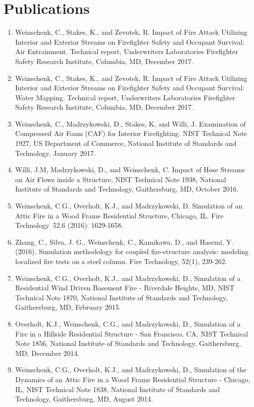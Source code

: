 \documentclass[10pt,letterpaper]{article}
\begin{document}
\clearpage

\section*{Publications}
\begin{enumerate}
\item Weinschenk, C., Stakes, K., and Zevotek, R. Impact of Fire Attack Utilizing Interior and Exterior Streams on Firefighter Safety and Occupant Survival: Air Entrainment. Technical report, Underwriters Laboratories Firefighter Safety Research Institute, Columbia, MD, December 2017.
\item Weinschenk, C., Stakes, K., and Zevotek, R. Impact of Fire Attack Utilizing Interior and Exterior Streams on Firefighter Safety and Occupant Survival: Water Mapping. Technical report, Underwriters Laboratories Firefighter Safety Research Institute, Columbia, MD, December 2017.
\item Weinschenk, C., Madrzykowski, D., Stakes, K, and Willi, J. Examination of Compressed Air Foam (CAF) for Interior Firefighting. NIST Technical Note 1927, US Department of Commerce, National Institute of Standards and Technology, January 2017.
\item Willi, J.M, Madrzykowski, D., and Weinschenk, C. Impact of Hose Streams on Air Flows inside a
Structure, NIST Technical Note 1938, National Institute of Standards and Technology, Gaithersburg, MD, October 2016.
\item Weinschenk, C.G., Overholt, K.J., and Madrzykowski, D. Simulation of an Attic Fire in a Wood Frame Residential Structure, Chicago, IL. Fire Technology 52.6 (2016): 1629-1658.
\item Zhang, C., Silva, J. G., Weinschenk, C., Kamikawa, D., and Hasemi, Y. (2016). Simulation methodology for coupled fire-structure analysis: modeling localized fire tests on a steel column. Fire Technology, 52(1), 239-262.
\item Weinschenk, C.G., Overholt, K.J., and Madrzykowski, D., Simulation of a Residential Wind Driven Basement Fire - Riverdale Heights, MD, NIST Technical Note 1870, National Institute of Standards and Technology, Gaithersburg, MD, February 2015.
\item Overholt, K.J., Weinschenk, C.G., and Madrzykowski, D., Simulation of a Fire in a Hillside Residential Structure - San Francisco, CA, NIST Technical Note 1856, National Institute of Standards and Technology, Gaithersburg, MD, December 2014.
\item Weinschenk, C.G., Overholt, K.J., and Madrzykowski, D., Simulation of the Dynamics of an Attic Fire in a Wood Frame Residential Structure - Chicago, IL, NIST Technical Note 1838, National Institute of Standards and Technology, Gaithersburg, MD, August 2014.

\end{enumerate}
\end{document}
